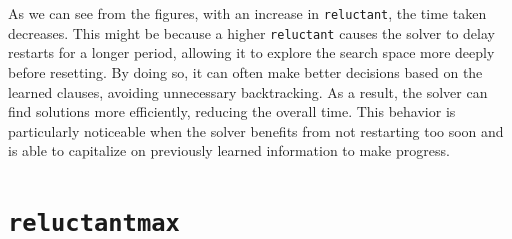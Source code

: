 \documentclass{article}
\begin{document}
    As we can see from the figures, with an increase in \texttt{reluctant},
    the time taken decreases. This might be because a higher \texttt{reluctant}
    causes the solver to delay restarts for a longer period, allowing it to
    explore the search space more deeply before resetting. By doing so, it can
    often make better decisions based on the learned clauses, avoiding
    unnecessary backtracking. As a result, the solver can find solutions more
    efficiently, reducing the overall time. This behavior is particularly
    noticeable when the solver benefits from not restarting too soon and is
    able to capitalize on previously learned information to make progress.

    \section*{\texttt{reluctantmax}}
\end{document}
